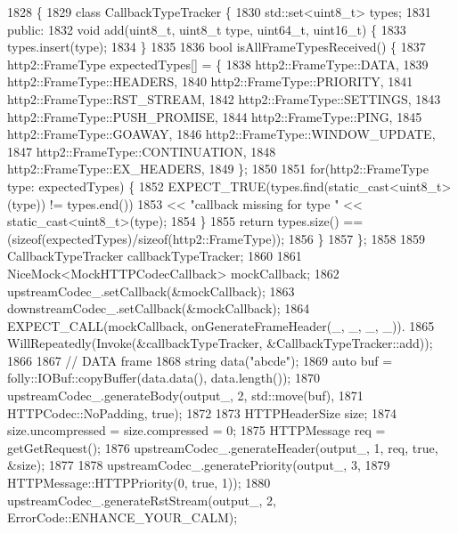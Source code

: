 \begin{DoxyCode}
1828                                                         \{
1829   \textcolor{keyword}{class }CallbackTypeTracker \{
1830     std::set<uint8\_t> types;
1831   \textcolor{keyword}{public}:
1832     \textcolor{keywordtype}{void} add(uint8\_t, uint8\_t type, uint64\_t, uint16\_t) \{
1833       types.insert(type);
1834     \}
1835 
1836     \textcolor{keywordtype}{bool} isAllFrameTypesReceived() \{
1837       http2::FrameType expectedTypes[] = \{
1838         http2::FrameType::DATA,
1839         http2::FrameType::HEADERS,
1840         http2::FrameType::PRIORITY,
1841         http2::FrameType::RST_STREAM,
1842         http2::FrameType::SETTINGS,
1843         http2::FrameType::PUSH\_PROMISE,
1844         http2::FrameType::PING,
1845         http2::FrameType::GOAWAY,
1846         http2::FrameType::WINDOW_UPDATE,
1847         http2::FrameType::CONTINUATION,
1848         http2::FrameType::EX\_HEADERS,
1849       \};
1850 
1851       \textcolor{keywordflow}{for}(http2::FrameType type: expectedTypes) \{
1852         EXPECT\_TRUE(types.find(static\_cast<uint8\_t>(type)) != types.end())
1853           << \textcolor{stringliteral}{"callback missing for type "} << static\_cast<uint8\_t>(type);
1854       \}
1855       \textcolor{keywordflow}{return} types.size() == (\textcolor{keyword}{sizeof}(expectedTypes)/\textcolor{keyword}{sizeof}(http2::FrameType));
1856     \}
1857   \};
1858 
1859   CallbackTypeTracker callbackTypeTracker;
1860 
1861   NiceMock<MockHTTPCodecCallback> mockCallback;
1862   upstreamCodec\_.setCallback(&mockCallback);
1863   downstreamCodec\_.setCallback(&mockCallback);
1864   EXPECT\_CALL(mockCallback, onGenerateFrameHeader(\_, \_, \_, \_)).
1865     WillRepeatedly(Invoke(&callbackTypeTracker, &CallbackTypeTracker::add));
1866 
1867   \textcolor{comment}{// DATA frame}
1868   \textcolor{keywordtype}{string} data(\textcolor{stringliteral}{"abcde"});
1869   \textcolor{keyword}{auto} buf = folly::IOBuf::copyBuffer(data.data(), data.length());
1870   upstreamCodec\_.generateBody(output\_, 2, std::move(buf),
1871                               HTTPCodec::NoPadding, \textcolor{keyword}{true});
1872 
1873   HTTPHeaderSize size;
1874   size.uncompressed = size.compressed = 0;
1875   HTTPMessage req = getGetRequest();
1876   upstreamCodec\_.generateHeader(output\_, 1, req, \textcolor{keyword}{true}, &size);
1877 
1878   upstreamCodec\_.generatePriority(output\_, 3,
1879                                   HTTPMessage::HTTPPriority(0, \textcolor{keyword}{true}, 1));
1880   upstreamCodec\_.generateRstStream(output\_, 2, ErrorCode::ENHANCE\_YOUR\_CALM);

\end{DoxyCode}
